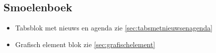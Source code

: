 \subsection{Smoelenboek}
\label{sec:smoelenboek}

\begin{itemize}
  \item Tabsblok met nieuws en agenda zie \ref{sec:tabsmetnieuwsenagenda}
  \item Grafisch element blok zie \ref{sec:grafischelement}
\end{itemize}